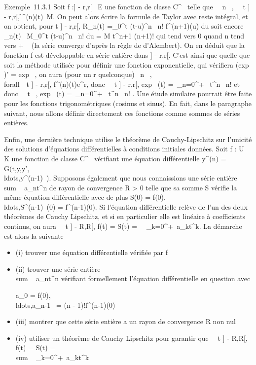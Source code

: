 \documentclass[]{article}
\begin{document}
Exemple~11.3.1 Soit f :] - r,r[\rightarrow~ E une fonction de classe
C^\infty~ telle que \forall~~n \in {}~,
\forall~~t \in] - r,r[,
\f^(n)(t)\
\leq M. On peut alors écrire la formule de Taylor avec reste intégral, et
on obtient, pour t \in] - r,r[, R_n(t)
=\int  _0^t (t-u)^n~
\over n! f^(n+1)(u) du soit encore
\R_n(t)\ \leq
M\int  _0^t (t-u)^n~
\over n! du = M t^n+1 \over
(n+1)! qui tend vers 0 quand n tend vers + \infty~ (la série converge
d'après la règle de d'Alembert). On en déduit que la fonction f est
développable en série entière dans ] - r,r[. C'est ainsi que quelle
que soit la méthode utilisée pour définir une fonction exponentielle,
qui vérifiera (exp~ )'
= exp~ , on aura (pour un r quelconque)
\forall~n \in {}~, \\forall~~t \in] -
r,r[, f^(n)(t)\leq e^r, donc
\forall~~t \in] - r,r[,
exp~ (t) =\
\sum  _n=0^+\infty~ t^n~
\over n! et donc \forall~~t \in {}~,
exp~ (t) =\
\sum  _n=0^+\infty~ t^n~
\over n! . Une étude similaire pourrait être faite pour
les fonctions trigonométriques (cosinus et sinus). En fait, dans le
paragraphe suivant, nous allons définir directement ces fonctions comme
sommes de séries entières.

Enfin, une dernière technique utilise le théorème de Cauchy-Lipschitz
sur l'unicité des solutions d'équations différentielles à conditions
initiales données. Soit f : U \rightarrow~ K une fonction de classe C^\infty~
vérifiant une équation différentielle y^(n) =
G(t,y,y',\\ldots,y^(n-1)~).
Supposons également que nous connaissions une série entière
\\sum ~
a_nt^n de rayon de convergence R > 0
telle que sa somme S vérifie la même équation différentielle avec de
plus S(0) =
f(0),\\ldots,S^(n-1)~(0)
= f^(n-1)(0). Si l'équation différentielle relève de l'un des
deux théorèmes de Cauchy Lipschitz, et si en particulier elle est
linéaire à coefficients continus, on aura \forall~~t
\in] - R,R[\bigcapU, f(t) = S(t) =\
\sum ~
_k=0^+\infty~a_kt^k. La démarche est alors
la suivante

\begin{itemize}
\item
  (i) trouver une équation différentielle vérifiée par f
\item
  (ii) trouver une série entière
  \\sum ~
  a_nt^n vérifiant formellement l'équation
  différentielle en question avec

  a_0 =
  f(0),\\ldots,a_n-1~
  = (n - 1)!f^(n-1)(0)
\item
  (iii) montrer que cette série entière a un rayon de convergence R non
  nul
\item
  (iv) utiliser un théorème de Cauchy Lipschitz pour garantir que
  \forall~~t \in] - R,R[\bigcapU, f(t) = S(t)
  = \\sum ~
  _k=0^+\infty~a_kt^k
\end{itemize}
\end{document}
